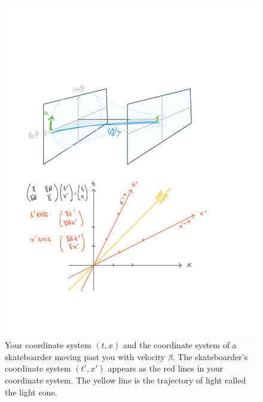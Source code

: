 \documentclass[12pt]{article}
\begin{document}
\begin{figure}[tb]
    \centering
    \includegraphics[width=.6\textwidth]{figures/rel_axes.pdf}
    \caption{Your coordinate system $(t,x)$ and the coordinate system of a skateboarder moving past you with velocity $\beta$. The skateboarder's coordinate system $(t',x')$ appears as the red lines in your coordinate system. The yellow line is the trajectory of light called the light cone.}
    \label{fig:re:axes}
\end{figure}
\end{document}
